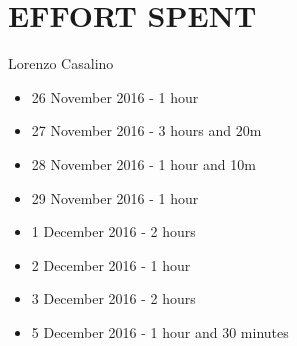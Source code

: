 \section{EFFORT SPENT}

	Lorenzo Casalino

	\begin{itemize}
		\item 26 November 2016 - 1 hour
		\item 27 November 2016 - 3 hours and 20m
		\item 28 November 2016 - 1 hour and 10m
		\item 29 November 2016 - 1 hour
		\item 1  December 2016 - 2 hours
		\item 2  December 2016 - 1 hour
		\item 3  December 2016 - 2 hours
		\item 5  December 2016 - 1 hour and 30 minutes
	\end{itemize}

